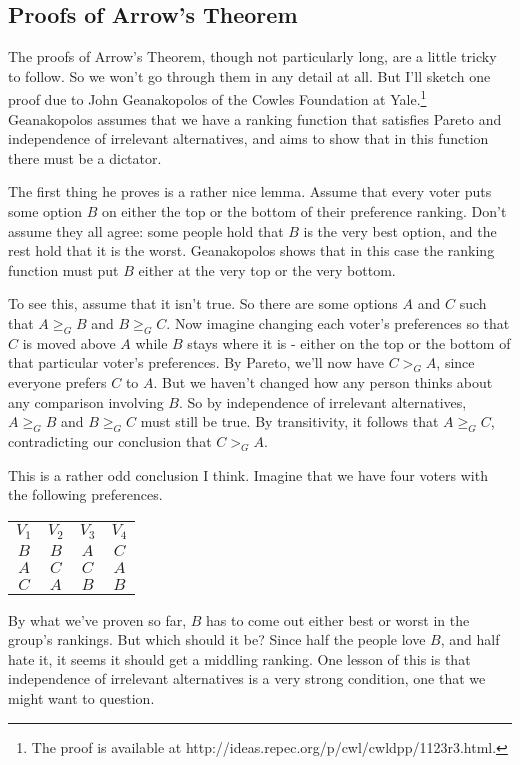 \begin{multicols}{2}
\section{Proofs of Arrow's Theorem}
The proofs of Arrow's Theorem, though not particularly long, are a little tricky to follow. So we won't go through them in any detail at all. But I'll sketch one proof due to John Geanakopolos of the Cowles Foundation at Yale.\footnote{The proof is available at http://ideas.repec.org/p/cwl/cwldpp/1123r3.html.} Geanakopolos assumes that we have a ranking function that satisfies Pareto and independence of irrelevant alternatives, and aims to show that in this function there must be a dictator.

The first thing he proves is a rather nice lemma. Assume that every voter puts some option $B$ on either the top or the bottom of their preference ranking. Don't assume they all agree: some people hold that $B$ is the very best option, and the rest hold that it is the worst. Geanakopolos shows that in this case the ranking function must put $B$ either at the very top or the very bottom.

To see this, assume that it isn't true. So there are some options $A$ and $C$ such that $A \geq_G B$ and $B \geq_G C$. Now imagine changing each voter's preferences so that $C$ is moved above $A$ while $B$ stays where it is - either on the top or the bottom of that particular voter's preferences. By Pareto, we'll now have $C >_G A$, since everyone prefers $C$ to $A$. But we haven't changed how any person thinks about any comparison involving $B$. So by independence of irrelevant alternatives, $A \geq_G B$ and $B \geq_G C$ must still be true. By transitivity, it follows that $A \geq_G C$, contradicting our conclusion that $C >_G A$.

This is a rather odd conclusion I think. Imagine that we have four voters with the following preferences. 

\begin{center}
\begin{tabular}{c c c c}
$V_1$ & $V_2$ & $V_3$ & $V_4$ \\ 
$B$ & $B$ & $A$ & $C$ \\
$A$ & $C$ & $C$ & $A$ \\
$C$ & $A$ & $B$ & $B$
\end{tabular}
\end{center}
By what we've proven so far, $B$ has to come out either best or worst in the group's rankings. But which should it be? Since half the people love $B$, and half hate it, it seems it should get a middling ranking. One lesson of this is that independence of irrelevant alternatives is a very strong condition, one that we might want to question.


\end{multicols}
